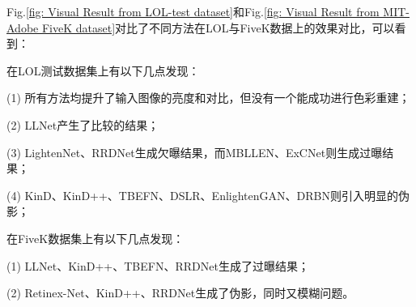 \documentclass[letterpaper,12pt]{article}
\begin{document}
	Fig.\ref{fig: Visual Result from LOL-test dataset}和Fig.\ref{fig: Visual Result from MIT-Adobe FiveK dataset}对比了不同方法在LOL与FiveK数据上的效果对比，可以看到：
	
	在LOL测试数据集上有以下几点发现：
	
	(1) 所有方法均提升了输入图像的亮度和对比，但没有一个能成功进行色彩重建；
	
	(2) LLNet产生了比较的结果；
	
	(3) LightenNet、RRDNet生成欠曝结果，而MBLLEN、ExCNet则生成过曝结果；
	
	(4) KinD、KinD++、TBEFN、DSLR、EnlightenGAN、DRBN则引入明显的伪影；
	
	在FiveK数据集上有以下几点发现：
	
	(1) LLNet、KinD++、TBEFN、RRDNet生成了过曝结果；
	
	(2) Retinex-Net、KinD++、RRDNet生成了伪影，同时又模糊问题。
	
\end{document}

